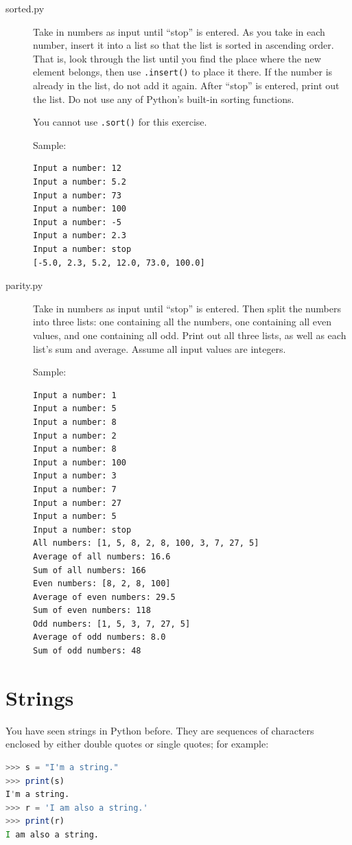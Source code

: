 \documentclass[11pt]{cselabheader}
\begin{document}
\begin{description}
  \item[sorted.py] Take in numbers as input until ``stop'' is entered. As you
    take in each number, insert it into a list so that the list is sorted in
    ascending order. That is, look through the list until you find the place
    where the new element belongs, then use \lstinline{.insert()} to place it
    there. If the number is already in the list, do not add it again. After
    ``stop'' is entered, print out the list. Do not use any of Python's built-in
    sorting functions.

    You cannot use \lstinline!.sort()! for this exercise.

    Sample:
\begin{lstlisting}[style=ipython]
Input a number: 12
Input a number: 5.2
Input a number: 73
Input a number: 100
Input a number: -5
Input a number: 2.3
Input a number: stop
[-5.0, 2.3, 5.2, 12.0, 73.0, 100.0]
\end{lstlisting}

  \item[parity.py] Take in numbers as input until ``stop'' is entered. Then split the numbers into three lists: one containing all the numbers, one containing all even values, and one containing all odd. Print out all three lists, as well as each list's sum and average. Assume all input values are integers.

    Sample:
\begin{lstlisting}[style=bash]
Input a number: 1
Input a number: 5
Input a number: 8
Input a number: 2
Input a number: 8
Input a number: 100
Input a number: 3
Input a number: 7
Input a number: 27
Input a number: 5
Input a number: stop
All numbers: [1, 5, 8, 2, 8, 100, 3, 7, 27, 5]
Average of all numbers: 16.6
Sum of all numbers: 166
Even numbers: [8, 2, 8, 100]
Average of even numbers: 29.5
Sum of even numbers: 118
Odd numbers: [1, 5, 3, 7, 27, 5]
Average of odd numbers: 8.0
Sum of odd numbers: 48
\end{lstlisting}
\end{description}

\pagebreak
\section{Strings}

You have seen strings in Python before. They are sequences of characters
enclosed by either double quotes or single quotes; for example:
\begin{lstlisting}[style=ipython,language=Octave] % string escaping issues with Python style
>>> s = "I'm a string."
>>> print(s)
I'm a string.
>>> r = 'I am also a string.'
>>> print(r)
I am also a string.
\end{lstlisting}
\end{document}
